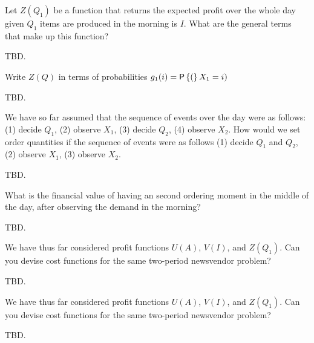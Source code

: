 \begin{question}
Let $Z(Q_1)$ be a function that returns the expected profit over the whole day given $Q_1$ items are produced in the morning is $I$. What are the general terms that make up this function?
   \begin{solution}
     TBD.
   \end{solution}
\end{question}

\begin{question}
Write $Z(Q)$ in terms of probabilities $g_1(i)=\P(X_1=i)$
   \begin{solution}
     TBD.
   \end{solution}
\end{question}

\begin{question}
We have so far assumed that the sequence of events over the day were as follows: (1) decide $Q_1$, (2) observe $X_1$, (3) decide $Q_2$, (4) observe $X_2$. How would we set order quantities if the sequence of events were as follows (1) decide $Q_1$ and $Q_2$, (2) observe $X_1$, (3) observe $X_2$.
   \begin{solution}
     TBD.
   \end{solution}
\end{question}

\begin{question}
What is the financial value of having an second ordering moment in the middle of the day, after observing the demand in the morning?
   \begin{solution}
     TBD.
   \end{solution}
\end{question}

\begin{question}
We have thus far considered profit functions $U(A)$, $V(I)$, and $Z(Q_1)$. Can you devise cost functions for the same two-period newsvendor problem?
   \begin{solution}
     TBD.
   \end{solution}
\end{question}

\begin{question}
We have thus far considered profit functions $U(A)$, $V(I)$, and $Z(Q_1)$. Can you devise cost functions for the same two-period newsvendor problem?
   \begin{solution}
     TBD.
   \end{solution}
\end{question}

